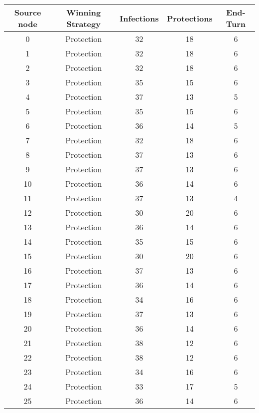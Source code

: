 \documentclass[results.tex]{subfiles}
\begin{document}
\begin{center}
  \begin{tabular}{| c || c | c | c | c |}
    \hline
    {\bfseries Source node} & {\bfseries Winning Strategy} & {\bfseries Infections} & {\bfseries Protections} & {\bfseries End-Turn} \\  %
    \hline\hline
    0 & Protection & 32 & 18 & 6 \\ 
    \hline
    1 & Protection & 32 & 18 & 6 \\ 
    \hline
    2 & Protection & 32 & 18 & 6 \\ 
    \hline
    3 & Protection & 35 & 15 & 6 \\ 
    \hline
    4 & Protection & 37 & 13 & 5 \\ 
    \hline
    5 & Protection & 35 & 15 & 6 \\ 
    \hline
    6 & Protection & 36 & 14 & 5 \\ 
    \hline
    7 & Protection & 32 & 18 & 6 \\ 
    \hline
    8 & Protection & 37 & 13 & 6 \\ 
    \hline
    9 & Protection & 37 & 13 & 6 \\ 
    \hline
    10 & Protection & 36 & 14 & 6 \\ 
    \hline
    11 & Protection & 37 & 13 & 4 \\ 
    \hline
    12 & Protection & 30 & 20 & 6 \\ 
    \hline
    13 & Protection & 36 & 14 & 6 \\ 
    \hline
    14 & Protection & 35 & 15 & 6 \\ 
    \hline
    15 & Protection & 30 & 20 & 6 \\ 
    \hline
    16 & Protection & 37 & 13 & 6 \\ 
    \hline
    17 & Protection & 36 & 14 & 6 \\ 
    \hline
    18 & Protection & 34 & 16 & 6 \\ 
    \hline
    19 & Protection & 37 & 13 & 6 \\ 
    \hline
    20 & Protection & 36 & 14 & 6 \\ 
    \hline
    21 & Protection & 38 & 12 & 6 \\ 
    \hline
    22 & Protection & 38 & 12 & 6 \\ 
    \hline
    23 & Protection & 34 & 16 & 6 \\ 
    \hline
    24 & Protection & 33 & 17 & 5 \\ 
    \hline
    25 & Protection & 36 & 14 & 6 \\ 

\end{tabular}
\end{center}
\end{document}
